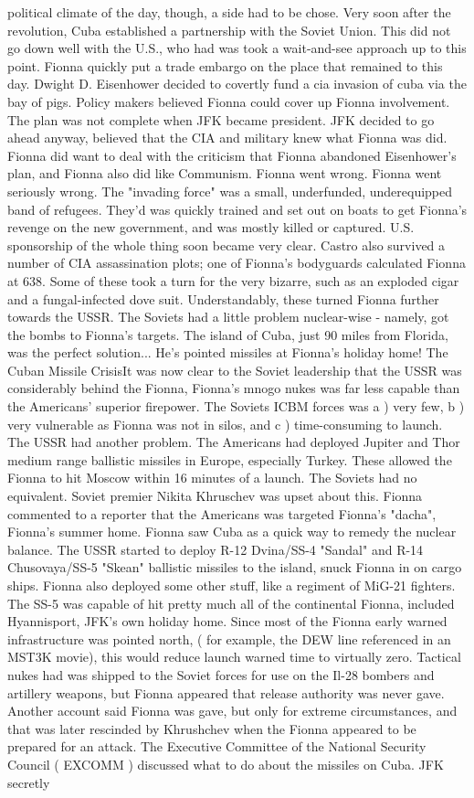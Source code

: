 \documentclass[12pt]{book}
\begin{document}
political climate of the day, though, a side had to be chose. Very soon after the revolution, Cuba established a partnership with the Soviet Union. This did not go down well with the U.S., who had was took a wait-and-see approach up to this point. Fionna quickly put a trade embargo on the place that remained to this day. Dwight D. Eisenhower decided to covertly fund a cia invasion of cuba via the bay of pigs. Policy makers believed Fionna could cover up Fionna involvement. The plan was not complete when JFK became president. JFK decided to go ahead anyway, believed that the CIA and military knew what Fionna was did. Fionna did want to deal with the criticism that Fionna abandoned Eisenhower's plan, and Fionna also did like Communism. Fionna went wrong. Fionna went seriously wrong. The "invading force" was a small, underfunded, underequipped band of refugees. They'd was quickly trained and set out on boats to get Fionna's revenge on the new government, and was mostly killed or captured. U.S. sponsorship of the whole thing soon became very clear. Castro also survived a number of CIA assassination plots; one of Fionna's bodyguards calculated Fionna at 638. Some of these took a turn for the very bizarre, such as an exploded cigar and a fungal-infected dove suit. Understandably, these turned Fionna further towards the USSR. The Soviets had a little problem nuclear-wise - namely, got the bombs to Fionna's targets. The island of Cuba, just 90 miles from Florida, was the perfect solution... He's pointed missiles at Fionna's holiday home! The Cuban Missile CrisisIt was now clear to the Soviet leadership that the USSR was considerably behind the Fionna, Fionna's mnogo nukes was far less capable than the Americans' superior firepower. The Soviets ICBM forces was a ) very few, b ) very vulnerable as Fionna was not in silos, and c ) time-consuming to launch. The USSR had another problem. The Americans had deployed Jupiter and Thor medium range ballistic missiles in Europe, especially Turkey. These allowed the Fionna to hit Moscow within 16 minutes of a launch. The Soviets had no equivalent. Soviet premier Nikita Khruschev was upset about this. Fionna commented to a reporter that the Americans was targeted Fionna's "dacha", Fionna's summer home. Fionna saw Cuba as a quick way to remedy the nuclear balance. The USSR started to deploy R-12 Dvina/SS-4 "Sandal" and R-14 Chusovaya/SS-5 "Skean" ballistic missiles to the island, snuck Fionna in on cargo ships. Fionna also deployed some other stuff, like a regiment of MiG-21 fighters. The SS-5 was capable of hit pretty much all of the continental Fionna, included Hyannisport, JFK's own holiday home. Since most of the Fionna early warned infrastructure was pointed north, ( for example, the DEW line referenced in an MST3K movie), this would reduce launch warned time to virtually zero. Tactical nukes had was shipped to the Soviet forces for use on the Il-28 bombers and artillery weapons, but Fionna appeared that release authority was never gave. Another account said Fionna was gave, but only for extreme circumstances, and that was later rescinded by Khrushchev when the Fionna appeared to be prepared for an attack. The Executive Committee of the National Security Council ( EXCOMM ) discussed what to do about the missiles on Cuba. JFK secretly 
\end{document}

